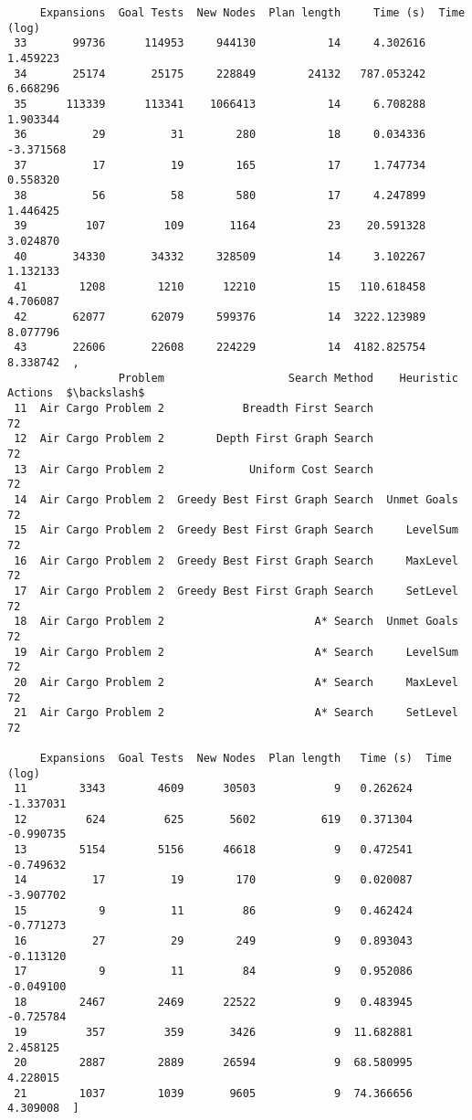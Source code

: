 \documentclass{article}
\begin{document}
\begin{verbatim}
     Expansions  Goal Tests  New Nodes  Plan length     Time (s)  Time (log)  
 33       99736      114953     944130           14     4.302616    1.459223  
 34       25174       25175     228849        24132   787.053242    6.668296  
 35      113339      113341    1066413           14     6.708288    1.903344  
 36          29          31        280           18     0.034336   -3.371568  
 37          17          19        165           17     1.747734    0.558320  
 38          56          58        580           17     4.247899    1.446425  
 39         107         109       1164           23    20.591328    3.024870  
 40       34330       34332     328509           14     3.102267    1.132133  
 41        1208        1210      12210           15   110.618458    4.706087  
 42       62077       62079     599376           14  3222.123989    8.077796  
 43       22606       22608     224229           14  4182.825754    8.338742  ,
                 Problem                   Search Method    Heuristic  Actions  $\backslash$
 11  Air Cargo Problem 2            Breadth First Search                    72   
 12  Air Cargo Problem 2        Depth First Graph Search                    72   
 13  Air Cargo Problem 2             Uniform Cost Search                    72   
 14  Air Cargo Problem 2  Greedy Best First Graph Search  Unmet Goals       72   
 15  Air Cargo Problem 2  Greedy Best First Graph Search     LevelSum       72   
 16  Air Cargo Problem 2  Greedy Best First Graph Search     MaxLevel       72   
 17  Air Cargo Problem 2  Greedy Best First Graph Search     SetLevel       72   
 18  Air Cargo Problem 2                       A* Search  Unmet Goals       72   
 19  Air Cargo Problem 2                       A* Search     LevelSum       72   
 20  Air Cargo Problem 2                       A* Search     MaxLevel       72   
 21  Air Cargo Problem 2                       A* Search     SetLevel       72   
 
     Expansions  Goal Tests  New Nodes  Plan length   Time (s)  Time (log)  
 11        3343        4609      30503            9   0.262624   -1.337031  
 12         624         625       5602          619   0.371304   -0.990735  
 13        5154        5156      46618            9   0.472541   -0.749632  
 14          17          19        170            9   0.020087   -3.907702  
 15           9          11         86            9   0.462424   -0.771273  
 16          27          29        249            9   0.893043   -0.113120  
 17           9          11         84            9   0.952086   -0.049100  
 18        2467        2469      22522            9   0.483945   -0.725784  
 19         357         359       3426            9  11.682881    2.458125  
 20        2887        2889      26594            9  68.580995    4.228015  
 21        1037        1039       9605            9  74.366656    4.309008  ]\end{verbatim}
\end{document}
